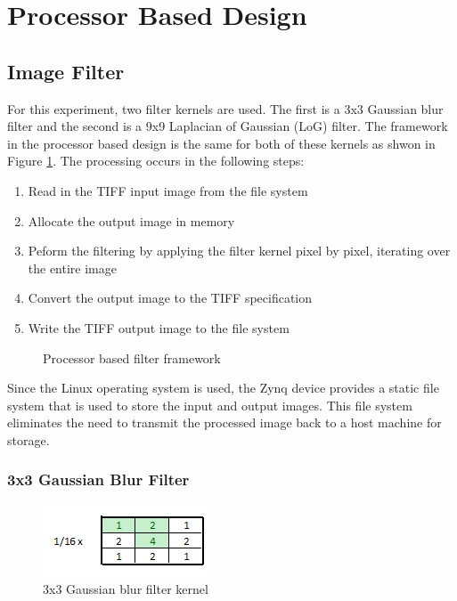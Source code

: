 \section{Processor Based Design}

\subsection{Image Filter}
For this experiment, two filter kernels are used.  The first is a 3x3 Gaussian blur filter and the second is a 9x9 Laplacian of Gaussian (LoG) filter.  The framework in the processor based design is the same for both of these kernels as shwon in Figure \ref{fig:filter_soft_framework}.  The processing occurs in the following steps:
\begin{enumerate}
  \item Read in the TIFF input image from the file system
  \item Allocate the output image in memory
  \item Peform the filtering by applying the filter kernel pixel by pixel, iterating over the entire image
  \item Convert the output image to the TIFF specification
  \item Write the TIFF output image to the file system
\end{enumerate}

\begin{figure}[h]
  \centering
  \caption{Processor based filter framework}
  \label{fig:filter_soft_framework}
\end{figure}

Since the Linux operating system is used, the Zynq device provides a static file system that is used to store the input and output images.  This file system eliminates the need to transmit the processed image back to a host machine for storage.

\subsubsection{3x3 Gaussian Blur Filter}
\begin{figure}[h]
  \centering
  \includegraphics{./img/filter_3x3_values.PNG}
  \caption{3x3 Gaussian blur filter kernel}
  \label{fig:3x3_filter}
\end{figure}

